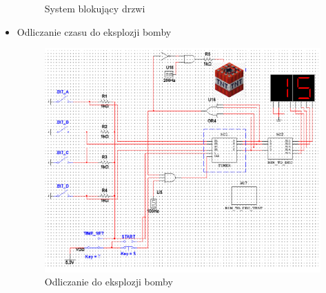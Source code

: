 \documentclass{article}
\begin{document}
\begin{itemize}
\begin{figure}[H]
            \caption{System blokujący drzwi}
        \end{figure}
        \item Odliczanie czasu do eksplozji bomby \begin{figure}[H]
            \centering
            \captionsetup{font=small, skip=2pt}
            \includegraphics{images/bomba}
            \caption{Odliczanie do eksplozji bomby}
        \end{figure}
    \end{itemize}
    
    
\end{document}
